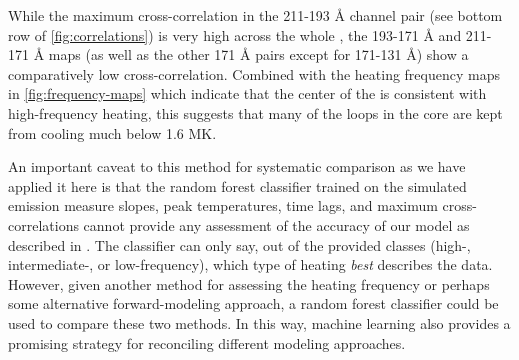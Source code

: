 While the maximum cross-correlation in the 211-193 \AA{} channel pair (see bottom row of \autoref{fig:correlations}) is very high across the whole \AR{}, the 193-171 \AA{} and 211-171 \AA{} maps (as well as the other 171 \AA{} pairs except for 171-131 \AA{}) show a comparatively low cross-correlation.
Combined with the heating frequency maps in \autoref{fig:frequency-maps} which indicate that the center of the \AR{} is consistent with high-frequency heating, this suggests that many of the loops in the core are kept from cooling much below 1.6 MK.


An important caveat to this method for systematic comparison as we have applied it here is that the random forest classifier trained on the simulated emission measure slopes, peak temperatures, time lags, and maximum cross-correlations cannot provide any assessment of the accuracy of our model as described in .
The classifier can only say, out of the provided classes (high-, intermediate-, or low-frequency), which type of heating \textit{best} describes the data.
However, given another method for assessing the heating frequency or perhaps some alternative forward-modeling approach, a random forest classifier could be used to compare these two methods.
In this way, machine learning also provides a promising strategy for reconciling different modeling approaches.
